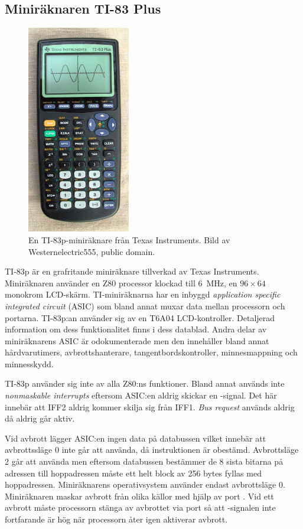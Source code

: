 \documentclass[main.tex]{subfiles}
\begin{document}
\subsection{Miniräknaren TI-83 Plus}
\begin{figure}
    \centering
    \includegraphics[width=0.4\textwidth, bb=0 0 284 578]{img/ti83p.jpg}
    \caption{En TI-83p-miniräknare från Texas Instruments. Bild av
    Westernelectric555, public domain.}
    \label{fig:ti83p}
\end{figure}
TI-83p är en grafritande miniräknare tillverkad av Texas Instruments.
Miniräknaren använder en Z80 processor klockad till \SI{6}{\mega\hertz}, en
$96\times64$ monokrom LCD-skärm. TI-miniräknarna har en inbyggd {\it
application specific integrated circuit} (ASIC) som bland annat muxar data
mellan processorn och portarna. TI-83p:an använder sig av en T6A04
LCD-kontroller. Detaljerad information om dess funktionalitet finns i dess
datablad\cite{t6a04}. Andra delar av miniräknarens ASIC är odokumenterade men
den innehåller bland annat hårdvarutimers, avbrottshanterare,
tangentbordskontroller, minnesmappning och minnesskydd.

TI-83p använder sig inte av alla Z80:ns funktioner. Bland annat används inte
{\it nonmaskable interrupts} eftersom ASIC:en aldrig skickar en
-signal. Det här innebär att IFF2 aldrig kommer skilja sig från IFF1.
{\it Bus request} används aldrig då  aldrig går aktiv.

Vid avbrott lägger ASIC:en ingen data på databussen vilket innebär att
avbrottssläge 0 inte går att använda, då instruktionen är obestämd.
Avbrottsläge 2 går att använda men eftersom databussen bestämmer de 8 sista
bitarna på adressen till hoppadressen måste ett helt block av 256 bytes fyllas
med hoppadressen. Miniräknarens operativsystem använder endast avbrottsläge 0.
Miniräknaren maskar avbrott från olika källor med hjälp av port . Vid
ett avbrott måste processorn stänga av avbrottet via port  så att
-signalen inte fortfarande är hög när processorn åter igen aktiverar
avbrott.
\end{document}
